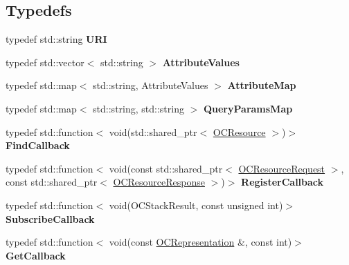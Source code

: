 \subsection*{Typedefs}
\begin{DoxyCompactItemize}
\item 
\hypertarget{namespaceOC_a5a45ee905cf6958fd93f6a15b8ec48f5}{}typedef std\+::string {\bfseries U\+R\+I}\label{namespaceOC_a5a45ee905cf6958fd93f6a15b8ec48f5}

\item 
\hypertarget{namespaceOC_a04bc0657950b19a82669fdb78f777eac}{}typedef std\+::vector$<$ std\+::string $>$ {\bfseries Attribute\+Values}\label{namespaceOC_a04bc0657950b19a82669fdb78f777eac}

\item 
\hypertarget{namespaceOC_ab16c9e154d9ee3038b8d609ef8c1d453}{}typedef std\+::map$<$ std\+::string, Attribute\+Values $>$ {\bfseries Attribute\+Map}\label{namespaceOC_ab16c9e154d9ee3038b8d609ef8c1d453}

\item 
\hypertarget{namespaceOC_a33c02cc76163f7747f0d8614eeaa8498}{}typedef std\+::map$<$ std\+::string, std\+::string $>$ {\bfseries Query\+Params\+Map}\label{namespaceOC_a33c02cc76163f7747f0d8614eeaa8498}

\item 
\hypertarget{namespaceOC_ad823e3b8335e73e26d4b9f1e992d0c47}{}typedef std\+::function$<$ void(std\+::shared\+\_\+ptr$<$ \hyperlink{classOC_1_1OCResource}{O\+C\+Resource} $>$)$>$ {\bfseries Find\+Callback}\label{namespaceOC_ad823e3b8335e73e26d4b9f1e992d0c47}

\item 
\hypertarget{namespaceOC_ac45b2075087ccf2d733383700854696c}{}typedef std\+::function$<$ void(const std\+::shared\+\_\+ptr$<$ \hyperlink{classOC_1_1OCResourceRequest}{O\+C\+Resource\+Request} $>$, const std\+::shared\+\_\+ptr$<$ \hyperlink{classOC_1_1OCResourceResponse}{O\+C\+Resource\+Response} $>$)$>$ {\bfseries Register\+Callback}\label{namespaceOC_ac45b2075087ccf2d733383700854696c}

\item 
\hypertarget{namespaceOC_a11105e64077702cf6f54ed3a8b2b4a40}{}typedef std\+::function$<$ void(O\+C\+Stack\+Result, const unsigned int)$>$ {\bfseries Subscribe\+Callback}\label{namespaceOC_a11105e64077702cf6f54ed3a8b2b4a40}

\item 
\hypertarget{namespaceOC_a98aa91f2ba6d69053a3d4139881828e5}{}typedef std\+::function$<$ void(const \hyperlink{classOC_1_1OCRepresentation}{O\+C\+Representation} \&, const int)$>$ {\bfseries Get\+Callback}\label{namespaceOC_a98aa91f2ba6d69053a3d4139881828e5}


\end{DoxyCompactItemize}
